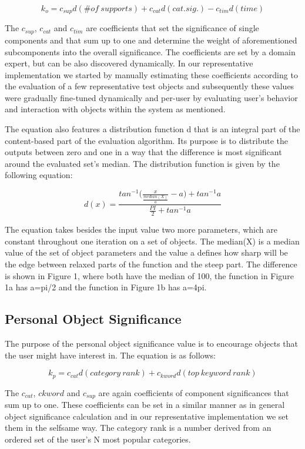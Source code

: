 \documentclass[10pt]{article}
\begin{document}
$$k_o=c_{sup}d(\#of~supports)+c_{cat}d(cat.sig.)-c_{tim}d(time)$$

The $c_{sup}$, $c_{cat}$ and $c_{tim}$ are coefficients that set the significance of single components and that sum up to one and determine the weight of aforementioned subcomponents into the overall significance. The coefficients are set by a domain expert, but can be also discovered dynamically. In our representative implementation we started by manually estimating these coefficients according to the evaluation of a few representative test objects and subsequently these values were gradually fine-tuned dynamically and per-user by evaluating user’s behavior and interaction with objects within the system as mentioned.

The equation also features a distribution function d that is an integral part of the content-based part of the evaluation algorithm. Its purpose is to distribute the outputs between zero and one in a way that the difference is most significant around the evaluated set’s median. The distribution function is given by the following equation:

\large $$d(x)=\frac{tan^{-1}\Big(\frac{x}{\frac{median(X)}{a}}-a\Big)+tan^{-1}a}{\frac{PI}{2}+tan^{-1}a}$$ \normalsize

The equation takes besides the input value two more parameters, which are constant throughout one iteration on a set of objects. The median(X) is a median value of the set of object parameters and the value a defines how sharp will be the edge between relaxed parts of the function and the steep part. The difference is shown in Figure 1, where both have the median of 100, the function in Figure 1a has a=pi/2 and the function in Figure 1b has a=4pi.



\subsection{Personal Object Significance}
The purpose of the personal object significance value is to encourage objects that the user might have interest in. The equation is as follows:

$$k_p=c_{cat} d(category~rank)+c_{kword} d(top~keyword~rank) $$

The $c_{cat}$, $c{kword}$ and $c_{sup}$ are again coefficients of component significances that sum up to one. These coefficients can be set in a similar manner as in general object significance calculation and in our representative implementation we set them in the selfsame way. The category rank is a number derived from an ordered set of the user’s N most popular categories.
\end{document}
